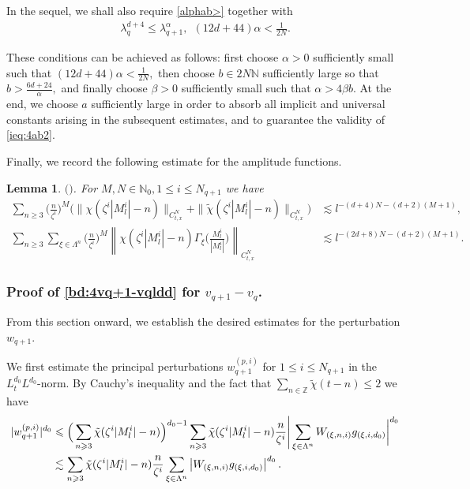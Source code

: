 \documentclass[10pt,a4paper]{amsart}
\numberwithin{equation}{section}
\newtheorem{lemma}[theorem]{Lemma}
\def\({{\Big(}}
\def\){{\Big)}}
\newcommand{\norm}[1]{\left\|#1\right\|}
\def\geq{\geqslant}
\def\leq{\leqslant}
\def\({{\Big(}}
\def\){{\Big)}}
\def\bl{\begin{lemma}}
\def\el{\end{lemma}}
\def\geq{\geqslant}
\def\leq{\leqslant}
\begin{document}
In the sequel, we shall also require \eqref{alphab>} together with \begin{align}
   \lambda_{q}^{d+4}\leq\lambda_{q+1}^\alpha,\ \ (12d+44)\alpha<\frac1{2N}.
 \end{align} 
 
These conditions can be achieved as follows:
first choose $\alpha>0$ sufficiently small such that
$
(12d+44)\alpha<\frac1{2N},
$
then choose
$
b\in2N\mathbb{N}
$
sufficiently large so that
$
b>\frac{6d+24}{\alpha},
$
and finally choose $\beta>0$ sufficiently small such that
$
\alpha>4\beta b.
$
At the end, we choose $a$ sufficiently large in order to absorb all implicit and universal constants arising in the subsequent estimates, and to guarantee the validity of \eqref{ieq:4ab2}.


Finally, we record the following estimate for the amplitude functions.

\bl\label{lem:4chi}$($\cite[Proposition 5.2]{LRZ25}$)$.
 For $ M,N\in\mathbb{N}_0,1\leq i\leq N_{q+1}$  we have
\begin{align*}
    \sum_{n\geq3} \(\frac{n}{\zeta^i}\)^M\(\|\chi(\zeta^i|M^{i}_l|-n)\|_{C_{t,x}^N}+ \|\tilde{\chi}(\zeta^i|M^{i}_l|-n)\|_{C_{t,x}^N}\)&\lesssim l^{- (d+4)N-(d+2)(M+1)},\\
     \sum_{n\geq3}\sum_{\xi\in\Lambda^{n}}\(\frac{n}{\zeta^i}\)^M\norm{\chi(\zeta^i|M^{i}_l|-n)\Gamma_\xi\(\frac{M^{i}_l}{|M^{i}_l|}\)}_{C_{t,x}^N}& \lesssim l^{-(2d+8)N-(d+2)(M+1)}.
\end{align*}
\el 

\subsubsection{Proof of  \eqref{bd:4vq+1-vqldd}  for $v_{q+1}-v_q$.}
From this section onward, we establish the desired estimates for the perturbation $w_{q+1}$.

We first estimate the principal perturbations $w_{q+1}^{(p,i)}$ for   $1\leq i\leq N_{q+1}$ in the $L_t^{d_0}L^{d_0}$-norm. By Cauchy's inequality and the fact that $\sum_{n\in\mathbb{Z}} \tilde{\chi}(t - n) \leq2$  we have
\begin{align}
|w_{q+1}^{(p,i)}|^{d_0}&\leq\(\sum_{n\geq3}\tilde{\chi}(\zeta^{i}|M^{i}_l|-n)\)^{d_0-1}\sum_{n\geq3}\tilde{\chi}(\zeta^{i}|M^{i}_l|-n)\frac{n}{\zeta^{i}}\Bigg{|}\sum_{\xi\in\Lambda^{n}}W_{(\xi,n,i)}g_{(\xi,i,d_0)}\bigg{|}^{d_0}\notag\\ 
&\lesssim \sum_{n\geq3}\tilde{\chi}(\zeta^{i}|M^{i}_l|-n)\frac{n}{\zeta^{i}}\sum_{\xi\in\Lambda^{n}}\left|W_{(\xi,n,i)}g_{(\xi,i,d_0)}\right|^{d_0}.\notag
\end{align} 
\end{document}
